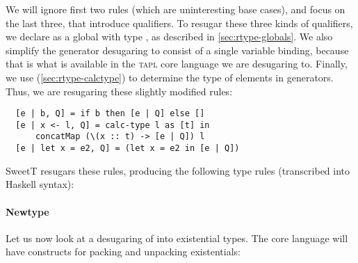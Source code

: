 We will ignore first two rules (which are uninteresting base cases),
and focus on the last three, that introduce qualifiers.
To resugar these three kinds of qualifiers, we declare
 as a global with type ,
as described in \cref{sec:rtype-globals}.
We also simplify the generator desugaring to
consist of a single variable binding, because that is what is
available in the \textsc{tapl} core language we are desugaring to.
Finally, we use  (\cref{sec:rtype-calctype}) to determine the
type of elements in generators.
Thus, we are resugaring these slightly modified rules:
\begin{verbatim}
  [e | b, Q] = if b then [e | Q] else []
  [e | x <- l, Q] = calc-type l as [t] in
      concatMap (\(x :: t) -> [e | Q]) l
  [e | let x = e2, Q] = (let x = e2 in [e | Q])
\end{verbatim}
{SweetT} resugars these rules, producing the following type
rules (transcribed into Haskell syntax):

\begin{prooftree}
\end{prooftree}

\begin{prooftree}
\end{prooftree}

\begin{prooftree}
\end{prooftree}



\paragraph{Newtype}

Let us now look at a desugaring of  into existential
types. The core language will have constructs for packing and unpacking
existentials:
\begin{prooftree}
\end{prooftree}

